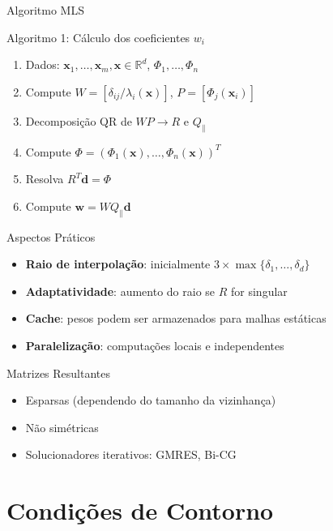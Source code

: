 \documentclass[../main/main.tex]{subfiles}
\begin{document}
\begin{frame}{Algoritmo MLS}
\begin{block}{Algoritmo 1: Cálculo dos coeficientes $w_i$}
\begin{enumerate}
\item Dados: $\mathbf{x}_1, \ldots, \mathbf{x}_m, \mathbf{x} \in \mathbb{R}^d$, $\Phi_1, \ldots, \Phi_n$
\item Compute $W = [\delta_{ij}/\lambda_i(\mathbf{x})]$, $P = [\Phi_j(\mathbf{x}_i)]$
\item Decomposição QR de $WP \rightarrow R$ e $Q_\parallel$
\item Compute $\Phi = (\Phi_1(\mathbf{x}), \ldots, \Phi_n(\mathbf{x}))^T$
\item Resolva $R^T \mathbf{d} = \Phi$
\item Compute $\mathbf{w} = W Q_\parallel \mathbf{d}$
\end{enumerate}
\end{block}
\end{frame}

\begin{frame}{Aspectos Práticos}
\begin{itemize}
\item \textbf{Raio de interpolação}: inicialmente $3 \times \max\{\delta_1, \ldots, \delta_d\}$
\item \textbf{Adaptatividade}: aumento do raio se $R$ for singular
\item \textbf{Cache}: pesos podem ser armazenados para malhas estáticas
\item \textbf{Paralelização}: computações locais e independentes
\end{itemize}

\begin{block}{Matrizes Resultantes}
\begin{itemize}
\item Esparsas (dependendo do tamanho da vizinhança)
\item Não simétricas
\item Solucionadores iterativos: GMRES, Bi-CG
\end{itemize}
\end{block}
\end{frame}

\section{Condições de Contorno}
\end{document}
